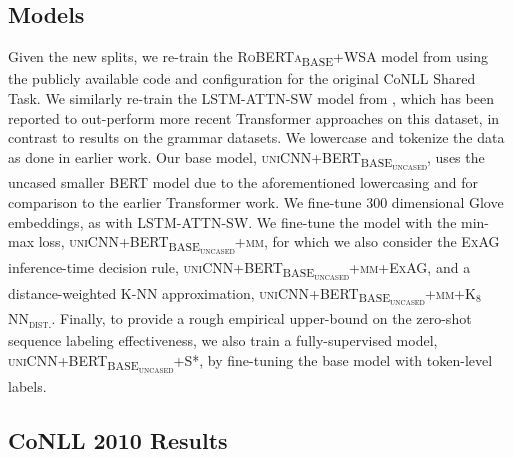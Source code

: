 \documentclass{clv3}
\begin{document}
\subsection{Models} Given the new splits, we re-train the \textsc{RoBERTa\textsubscript{BASE}+WSA} model from \citet{BujelEtAl-2021-Zeroshot-Weighted-Attention} using the publicly available code and configuration for the original CoNLL Shared Task. We similarly re-train the \textsc{LSTM-ATTN-SW} model from \citet{ReiAndSogaard-2018-ZeroShotSeq}, which has been reported to out-perform more recent Transformer approaches on this dataset, in contrast to results on the grammar datasets. We lowercase and tokenize the data as done in earlier work. Our base model, \textsc{uniCNN+BERT\textsubscript{BASE\textsubscript{uncased}}}, uses the uncased smaller BERT model due to the aforementioned lowercasing and for comparison to the earlier Transformer work. We fine-tune 300 dimensional Glove embeddings, as with \textsc{LSTM-ATTN-SW}. We fine-tune the model with the min-max loss, \textsc{uniCNN+BERT\textsubscript{BASE\textsubscript{uncased}}+mm}, for which we also consider the \textsc{ExAG} inference-time decision rule, \textsc{uniCNN+BERT\textsubscript{BASE\textsubscript{uncased}}+mm+ExAG}, and a distance-weighted K-NN approximation, \textsc{uniCNN+BERT\textsubscript{BASE\textsubscript{uncased}}+mm+K$_8$NN\textsubscript{dist.}}. Finally, to provide a rough empirical upper-bound on the zero-shot sequence labeling effectiveness, we also train a fully-supervised model, \textsc{uniCNN+BERT\textsubscript{BASE\textsubscript{uncased}}+S*}, by fine-tuning the base model with token-level labels.

\subsection{CoNLL 2010 Results}
\end{document}
